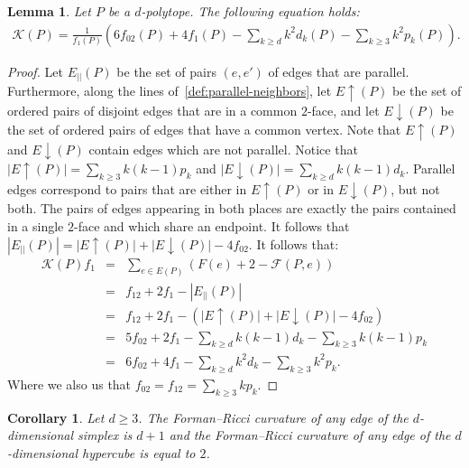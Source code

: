 \documentclass[11pt,a4paper]{amsart}
\newtheorem{corollary}[theorem]{Corollary}
\newtheorem{lemma}[theorem]{Lemma}
\begin{document}
\begin{lemma}\label{lemma:AverageCurvatureIdentity}
    Let $P$ be a $d$-polytope. The following equation holds: 
        \begin{align*}
            \mathcal{K}(P)= \frac{1}{f_1(P)}\left(6f_{02}(P) + 4f_1(P) - \sum_{k\ge d} k^2d_k(P) - \sum_{k\ge 3}k^2p_k(P)\right).
        \end{align*}
\end{lemma}

\begin{proof}
    Let $E_{||}(P)$ be the set of pairs $(e,e')$ of edges that are parallel. Furthermore, along the lines of~\cref{def:parallel-neighbors}, let $E\uparrow(P)$ be the set of ordered pairs of disjoint edges that are in a common $2$-face, and let $E\downarrow(P)$ be the set of ordered pairs of edges that have a common vertex. Note that $E\uparrow(P)$ and $E\downarrow(P)$ contain edges which are not parallel. Notice that $|E\uparrow(P)| = \sum_{k\ge 3} k(k-1)p_k$ and $|E\downarrow(P)| = \sum_{k\ge d} k(k-1)d_k$. Parallel edges correspond to pairs that are either in $E\uparrow(P)$ or in $E\downarrow(P)$, but not both. The pairs of edges appearing in both places are exactly the pairs contained in a single $2$-face and which share an endpoint. It follows that $|E_{||}(P)| = |E\uparrow(P)| + |E\downarrow(P)| - 4f_{02}$. It follows that:
        \begin{eqnarray*}
            \mathcal{K}(P)f_1 &=& \sum_{e\in E(P) } \left(F(e) + 2 -\mathcal{F}(P,e)\right) \\
            &=&  f_{12}+ 2f_1 - |E_{||}(P)| \\
            &=& f_{12} + 2f_1 - (|E\uparrow(P)| + |E\downarrow(P)| - 4f_{02}) \\ 
            &=& 5f_{02} + 2f_1 - \sum_{k\ge d} k(k-1)d_k - \sum_{k\ge 3}k(k-1)p_k \\ 
            &=& 6f_{02} + 4f_1 - \sum_{k\ge d} k^2d_k - \sum_{k\ge 3}k^2p_k.
        \end{eqnarray*}
     Where we also us that $f_{02}=f_{12}=\sum_{k\ge 3} kp_k$.
\end{proof}


\begin{corollary}
    Let $d\ge 3$. The Forman--Ricci curvature of any edge of the $d$-dimensional simplex is $d+1$ and the Forman--Ricci curvature of any edge of the $d$-dimensional hypercube is equal to $2$.
\end{corollary}
\end{document}

